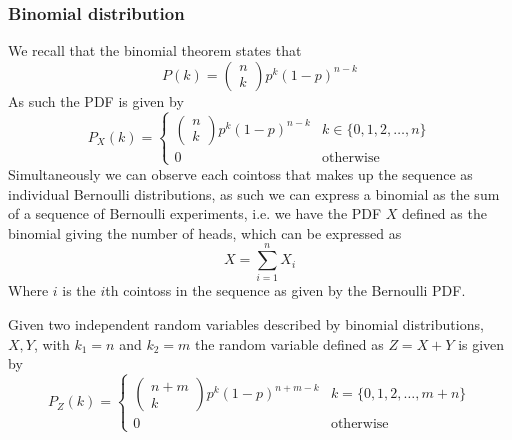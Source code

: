 \subsubsection{Binomial distribution}
We recall that the binomial theorem states that
\[
    P(k)=\begin{pmatrix}n\\k\end{pmatrix}p^{k}(1-p)^{n-k}
\]
As such the PDF is given by
\[
    P_{X}(k)=\begin{cases}\begin{pmatrix}n\\k\end{pmatrix}p^{k}(1-p)^{n-k} & k\in\{0,1,2,\ldots,n\} \\ 0 & \text{otherwise}\end{cases}
\]
Simultaneously we can observe each cointoss that makes up the sequence as individual Bernoulli distributions, as such we can express a binomial as the sum of a sequence of Bernoulli experiments, i.e. we have the PDF $X$ defined as the binomial giving the number of heads, which can be expressed as
\[
    X=\sum_{i=1}^{n}X_{i}
\]
Where $i$ is the $i$th cointoss in the sequence as given by the Bernoulli PDF.
\begin{theorem}
    Given two independent random variables described by binomial distributions, $X,Y$, with $k_{1}=n$ and $k_{2}=m$ the random variable defined as $Z=X+Y$ is given by
    \[
        P_{Z}(k)=\begin{cases}\begin{pmatrix}n+m\\k\end{pmatrix}p^{k}(1-p)^{n+m-k} & k=\{0,1,2,\ldots,m+n\} \\ 0 & \text{otherwise}\end{cases}
    \]
\end{theorem}
